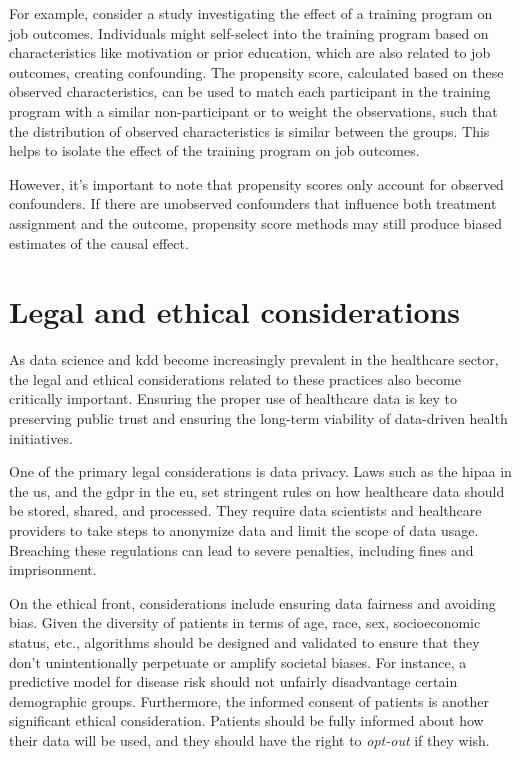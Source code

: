 \begin{enumerate}
    For example, consider a study investigating the effect of a training program on job outcomes. Individuals might self-select into the training program based on characteristics like motivation or prior education, which are also related to job outcomes, creating confounding. The propensity score, calculated based on these observed characteristics, can be used to match each participant in the training program with a similar non-participant or to weight the observations, such that the distribution of observed characteristics is similar between the groups. This helps to isolate the effect of the training program on job outcomes.
    
    However, it's important to note that propensity scores only account for observed confounders. If there are unobserved confounders that influence both treatment assignment and the outcome, propensity score methods may still produce biased estimates of the causal effect.
    
\end{enumerate}

\section{Legal and ethical considerations}


As data science and \ac{kdd} become increasingly prevalent in the healthcare sector, the legal and ethical considerations related to these practices also become critically important. Ensuring the proper use of healthcare data is key to preserving public trust and ensuring the long-term viability of data-driven health initiatives.

One of the primary legal considerations is data privacy. Laws such as the \ac{hipaa} in the \ac{us}, and the \ac{gdpr} in the \ac{eu}, set stringent rules on how healthcare data should be stored, shared, and processed. They require data scientists and healthcare providers to take steps to anonymize data and limit the scope of data usage. Breaching these regulations can lead to severe penalties, including fines and imprisonment.

On the ethical front, considerations include ensuring data fairness and avoiding bias. Given the diversity of patients in terms of age, race, sex, socioeconomic status, etc., algorithms should be designed and validated to ensure that they don't unintentionally perpetuate or amplify societal biases. For instance, a predictive model for disease risk should not unfairly disadvantage certain demographic groups. Furthermore, the informed consent of patients is another significant ethical consideration. Patients should be fully informed about how their data will be used, and they should have the right to \textit{opt-out} if they wish.

